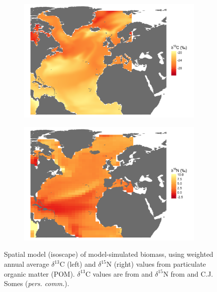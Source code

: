 \documentclass[a4paper,10pt]{article}
\begin{document}
\begin{figure}[!htbp]
    \centering
    \begin{subfigure}[t]{0.45\textwidth}
        \centering
        \includegraphics[width=\linewidth]{figures/Figure-S3-plankton-d13C-map.png} 
    \end{subfigure}
    \hfill
    \begin{subfigure}[t]{0.45\textwidth}
        \centering
        \includegraphics[width=\linewidth]{figures/Figure-S3-plankton-d15N-map.png} 
    \end{subfigure}
    \caption{Spatial model (isoscape) of model-simulated biomass, using weighted annual average $\delta^{13}$C (left) and $\delta^{15}$N (right) values from particulate organic matter (POM). $\delta^{13}$C values are from \cite{magozzi2017using} and $\delta^{15}$N from \cite{schmittner2016complementary} and C.J. Somes (\textit{pers. comm.}).} 
    \label{figs3}
\end{figure}
\end{document}
